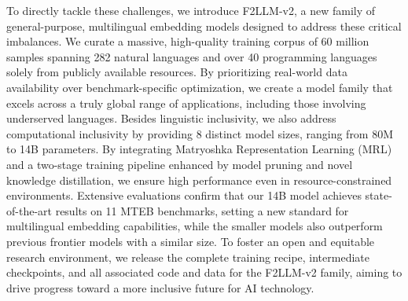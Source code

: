 To directly tackle these challenges, we introduce F2LLM-v2, a new family of general-purpose, multilingual embedding models designed to address these critical imbalances. We curate a massive, high-quality training corpus of 60 million samples spanning 282 natural languages and over 40 programming languages solely from publicly available resources. By prioritizing real-world data availability over benchmark-specific optimization, we create a model family that excels across a truly global range of applications, including those involving underserved languages. Besides linguistic inclusivity, we also address computational inclusivity by providing 8 distinct model sizes, ranging from 80M to 14B parameters. By integrating Matryoshka Representation Learning (MRL) and a two-stage training pipeline enhanced by model pruning and novel knowledge distillation, we ensure high performance even in resource-constrained environments. Extensive evaluations confirm that our 14B model achieves state-of-the-art results on 11 MTEB benchmarks, setting a new standard for multilingual embedding capabilities, while the smaller models also outperform previous frontier models with a similar size. To foster an open and equitable research environment, we release the complete training recipe, intermediate checkpoints, and all associated code and data for the F2LLM-v2 family, aiming to drive progress toward a more inclusive future for AI technology.